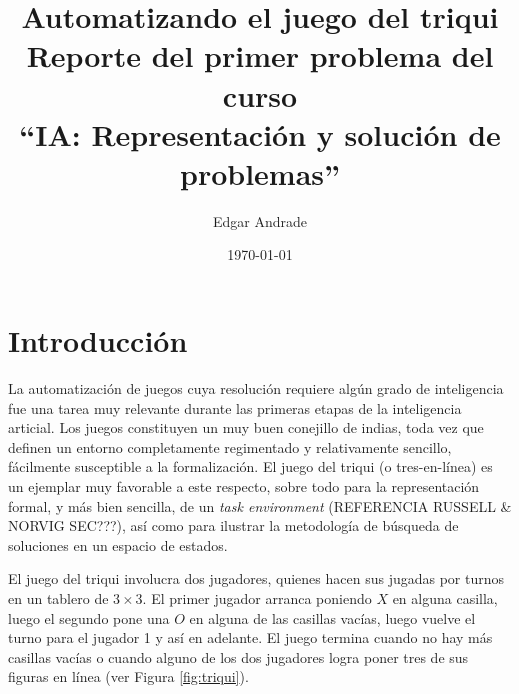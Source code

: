 \documentclass[11pt]{article}
\title{Automatizando el juego del triqui\\ Reporte del primer problema del curso\\ ``IA: Representación y solución de problemas''}
\author{Edgar Andrade}
\date{\today}
\begin{document}
\maketitle

\section{Introducción}

\noindent La automatización de juegos cuya resolución requiere algún grado de inteligencia fue una tarea muy relevante durante las primeras etapas de la inteligencia articial. Los juegos constituyen un muy buen conejillo de indias, toda vez que definen un entorno completamente regimentado y relativamente sencillo, fácilmente susceptible a la formalización. El juego del triqui (o tres-en-línea) es un ejemplar muy favorable a este respecto, sobre todo para la representación formal, y más bien sencilla, de un \emph{task environment} (REFERENCIA RUSSELL \& NORVIG SEC???), así como para ilustrar la metodología de búsqueda de soluciones en un espacio de estados.

El juego del triqui involucra dos jugadores, quienes hacen sus jugadas por turnos en un tablero de $3\times 3$. El primer jugador arranca poniendo $X$ en alguna casilla, luego el segundo pone una $O$ en alguna de las casillas vacías, luego vuelve el turno para el jugador 1 y así en adelante. El juego termina cuando no hay más casillas vacías o cuando alguno de los dos jugadores logra poner tres de sus figuras en línea (ver Figura \ref{fig:triqui}).
\end{document}
